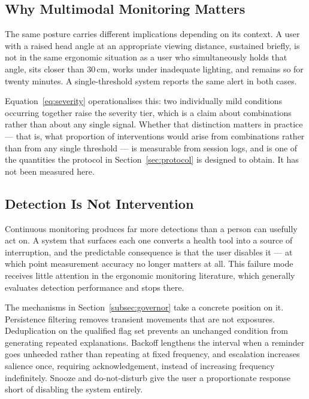 \subsection{Why Multimodal Monitoring Matters}

The same posture carries different implications depending on its context. A user with a raised head
angle at an appropriate viewing distance, sustained briefly, is not in the same ergonomic situation
as a user who simultaneously holds that angle, sits closer than $30\,\text{cm}$, works under
inadequate lighting, and remains so for twenty minutes. A single-threshold system reports the same
alert in both cases.

Equation~\ref{eq:severity} operationalises this: two individually mild conditions occurring
together raise the severity tier, which is a claim about combinations rather than about any single
signal. Whether that distinction matters in practice --- that is, what proportion of interventions
would arise from combinations rather than from any single threshold --- is measurable from session
logs, and is one of the quantities the protocol in Section~\ref{sec:protocol} is designed to
obtain. It has not been measured here.

\subsection{Detection Is Not Intervention}

Continuous monitoring produces far more detections than a person can usefully act on. A system that
surfaces each one converts a health tool into a source of interruption, and the predictable
consequence is that the user disables it --- at which point measurement accuracy no longer matters
at all. This failure mode receives little attention in the ergonomic monitoring literature, which
generally evaluates detection performance and stops there.

The mechanisms in Section~\ref{subsec:governor} take a concrete position on it. Persistence
filtering removes transient movements that are not exposures. Deduplication on the qualified flag
set prevents an unchanged condition from generating repeated explanations. Backoff lengthens the
interval when a reminder goes unheeded rather than repeating at fixed frequency, and escalation
increases salience once, requiring acknowledgement, instead of increasing frequency indefinitely.
Snooze and do-not-disturb give the user a proportionate response short of disabling the system
entirely.

